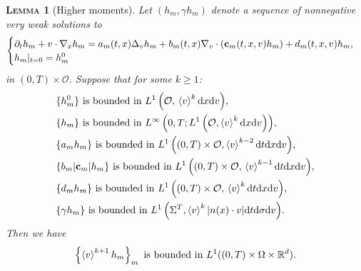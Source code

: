 \documentclass[10pt, reqno]{amsart}
\theoremstyle{plain}
\newtheorem{lemma}[theorem]{\normalfont \scshape Lemma}
\theoremstyle{definition}
\theoremstyle{remark}
\numberwithin{equation}{section}
\newcommand{\bfc}{{\bf c}}
\newcommand{\calO}{\mathcal O}
\newcommand{\p}{\partial}
\newcommand{\R}{\mathbb{R}}
\newcommand{\dx}{\textnormal{d}x}
\newcommand{\dv}{\textnormal{d}v}
\newcommand{\dt}{\textnormal{d}t}
\newcommand{\tnd}{\textnormal{d}}
\newcommand{\lt}{\left}
\newcommand{\rt}{\right}
\begin{document}
\begin{lemma}[Higher moments] \label{lem: higher moments}
    Let $(h_m,\gamma h_m)$ denote a sequence of nonnegative very weak solutions to 
    \begin{align*}
    \begin{cases}
    \p_t h_m + v\cdot \nabla_x h_m = a_m(t,x) \Delta_v h_m + b_m(t,x) \nabla_v\cdot (\bfc_m(t,x,v) h_m) + d_m(t,x,v) h_m,\\
    h_m|_{t=0} = h_m^0
    \end{cases}
    \end{align*}
    in $(0,T)\times \calO$. Suppose that for some $k \ge 1$:
    \begin{align*}
        &\textnormal{$\{h_m^0\}$ is bounded in $L^1 \lt( \calO, \, \lt<v\rt>^k\dx\dv \rt)$},  \\
        &\textnormal{$\{h_m\}$ is bounded in $L^\infty\left( 0,T ;L^1 \lt(\calO, \lt<v\rt>^k \dx\dv \rt) \right)$}, \\
        &\textnormal{$\{a_m h_m\}$ is bounded in $L^1\left((0,T)\times\calO, \lt<v\rt>^{k-2}\dt\dx\dv\right)$}, \\
        &\textnormal{$\{b_m |\bfc_m| h_m\}$ is bounded in $L^1\left((0,T)\times\calO, \,\lt<v\rt>^{k-1}\dt\dx\dv\right)$}, \\
        &\textnormal{$\{d_m h_m\}$ is bounded in $L^1\lt((0,T)\times\calO, \, \lt<v\rt>^k\dt\dx\dv \rt)$}, \\
        &\textnormal{$\{\gamma h_m\}$ is bounded in $L^1 \lt( \Sigma^T, \lt<v\rt>^k |n(x)\cdot v|\dt\tnd\sigma\dv \rt)$}. 
    \end{align*}
    Then we have
    \begin{align*}
        \left\{\lt<v\rt>^{k+1} h_m \right\}_m \textnormal{ is bounded in $L^1((0,T)\times\Omega\times\R^d)$}.
    \end{align*}
\end{lemma}
\end{document}
